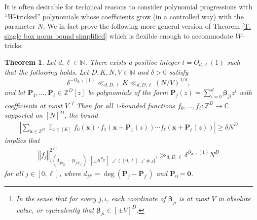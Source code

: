 \documentclass[11pt]{amsart}
\newtheorem{theorem}[lemma]{Theorem}
\theoremstyle{definition}
\DeclareMathOperator*{\E}{\mathbb{E}}
\newcommand{\C}{{\mathbb C}}
\newcommand{\N}{{\mathbb N}}
\newcommand{\Z}{{\mathbb Z}}
\newcommand{\bp}{{\textbf{P}}}
\newcommand{\p}{{\textbf{P}}}
\newcommand{\bx}{{\textbf{x}}}
\newcommand{\bbeta}{{\boldsymbol{\beta}}}
\newcommand{\norm}[1]{\left\Vert #1\right\Vert}
\newcommand{\abs}[1]{\mathopen{}\left| #1\mathclose{}\right|}
\begin{document}
It is often desirable for technical reasons to consider polynomial progressions with ``$W$-tricked'' polynomials whose coefficients grow (in a controlled way) with the parameter $N$.  We in fact prove the following more general version of Theorem \ref{T: single box norm bound simplified} which is flexible enough to accommodate $W$-tricks.
\begin{theorem}\label{T: single box norm bound}
Let $d, \ell \in \N$.  There exists a positive integer $t=O_{d, \ell}(1)$ such that the following holds.  Let $D, K, N, V\in\N$ and $\delta>0$ satisfy $$\delta^{-O_{d,\ell}(1)}\ll_{d, D, \ell} K\ll_{d,D,\ell} (N/V)^{1/d},$$  and let $\bp_1, \ldots, \bp_\ell\in\Z^D[z]$ be polynomials of the form $\bp_j(z) = \sum_{i=0}^d \bbeta_{ji}z^i$ with coefficients  at most $V$.\footnote{In the sense that for every $j,i$, each coordinate of $\bbeta_{ji}$ is at most $V$ in absolute value, or equivalently that $\bbeta_{ji}\in[\pm V]^D$.}
     Then for all $1$-bounded functions $f_0, \ldots, f_\ell:\Z^D\to\C$ supported on $[N]^D$, the bound
    \begin{align*}
            \abs{\sum_{\bx\in\Z^D}\E_{z\in[K]}
            f_0(\bx)\cdot f_1(\bx+\p_1(z))\cdots f_\ell(\bx+\p_\ell(z))} \geq \delta N^D
    \end{align*}
    implies that
    \begin{align}\label{E: the box norm 0}
        \norm{f_j}_{\{(\bbeta_{jd_{jj'}}-\bbeta_{j'd_{jj'}})\cdot[\pm K^{d_{jj'}}]:\; j'\in[0,\ell],\; j'\neq j\}^{ t}}^{2^{\ell t}}\gg_{d, D, \ell}\delta^{O_{d, \ell}(1)}N^{D}
    \end{align}
    for all $j\in[0,\ell]$, where $d_{jj'} = \deg (\bp_j - \bp_{j'})$ and $\bp_0 = \mathbf{0}$.
\end{theorem}
\end{document}
